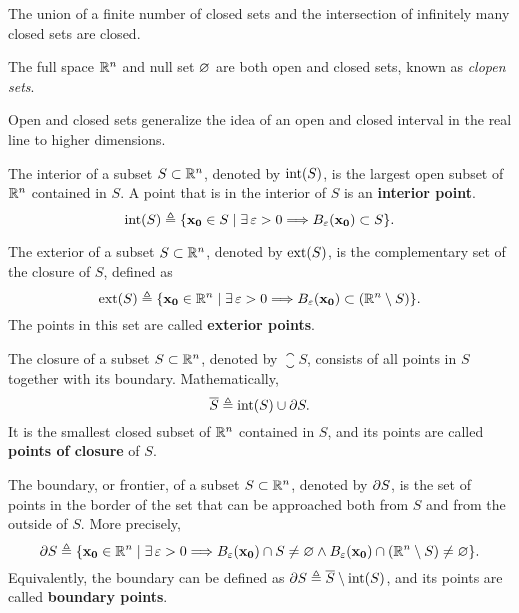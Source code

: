 \begin{prop}
The union of a finite number of closed sets and the intersection of infinitely many closed sets are closed.
\end{prop}

\begin{prop}
	The full space $\Rtn$ and null set $\O$ are both open and closed sets, known as \textit{clopen sets}.
\end{prop}

Open and closed sets generalize the idea of an open and closed interval in the real line to higher dimensions.

\begin{defn}[Interior]
	The interior of a subset $S\subset\Rtn$, denoted by $\interior{S}$, is the largest open subset of $\Rtn$ contained in $S$. 
	A point that is in the interior of $S$ is an \textbf{interior point}.
	\begin{equation}
		\interior{S}\bydef\{\vec{x_0}\in S\st\exists\epsilon > 0\implies B_\epsilon\argopen(\vec{x_0}\argclose)\subset S\}.
	\end{equation}
\end{defn}

\begin{defn}[Exterior]
	The exterior of a subset $S\subset\Rtn$, denoted by $\exterior{S}$, is the complementary set of the closure of $S$, defined as
	\begin{equation}
		\exterior{S}\bydef\{\vec{x_0}\in\Rtn\st\exists\epsilon > 0\implies B_\epsilon\argopen(\vec{x_0}\argclose)\subset
		\left(\Rtn\setminus S\right)\}.
	\end{equation}
	The points in this set are called \textbf{exterior points}.
\end{defn}

\begin{defn}[Closure]
	The closure of a subset $S\subset\Rtn$, denoted by $\closure{S}$, consists of all points in $S$ together with its boundary.
	Mathematically, 
	\begin{equation}
		\closure{S}\bydef\interior{S}\cup\frontier{S}.
	\end{equation}
	It is the smallest closed subset of $\Rtn$ contained in $S$, and its points are called \textbf{points of closure} of $S$.
\end{defn}

\begin{defn}[Boundary]
	The boundary, or frontier, of a subset $S\subset\Rtn$, denoted by $\partial S$, is the set of points in the border of the
	set that can be approached both from $S$ and from the outside of $S$. More precisely, 
	\begin{equation}
		\frontier{S}\bydef\{\vec{x_0}\in\Rtn\st\exists\epsilon > 0\implies B_\epsilon
		\argopen(\vec{x_0}\argclose)\cap S\neq\O\land B_\epsilon\argopen(\vec{x_0}\argclose)\cap\left(\Rtn\setminus S\right)
		\neq\O\}.
	\end{equation}
	Equivalently, the boundary can be defined as $\frontier{S}\bydef\closure{S}\setminus\interior{S}$, and its points are called
	\textbf{boundary points}.
\end{defn}

